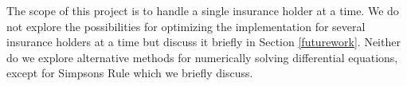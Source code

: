 
The scope of this project is to handle a single insurance holder at a time. We do not explore the possibilities for optimizing the implementation for several insurance holders at a time but discuss it briefly in Section \ref{futurework}. Neither do we explore alternative methods for numerically solving differential equations, except for Simpsons Rule which we briefly discuss.